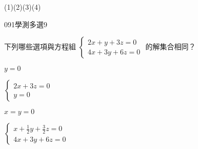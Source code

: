 \begin{QUESTIONS}
\begin{QUESTION}
\begin{QBODY}
        \end{QBODY}
        \begin{QFROMS}
        \end{QFROMS}
        \begin{QTAGS}\end{QTAGS}
        \begin{QANS}
            (1)(2)(3)(4)
        \end{QANS}
        \begin{QSOLLIST}
        \end{QSOLLIST}
        \begin{QEMPTYSPACE}
        \end{QEMPTYSPACE}
    \end{QUESTION}
    \begin{QUESTION}
        \begin{ExamInfo}{091}{學測}{多選}{9}
        \end{ExamInfo}
        \begin{ExamAnsRateInfo}{31}{53}{26}{14}
        \end{ExamAnsRateInfo}
        \begin{QBODY}
            下列哪些選項與方程組 $\left\{ \begin{array}{l} 2x+y+3z=0 \\ 4x+3y+6z =0 \end{array}\right.$ 的解集合相同？
            
            \begin{QOPS} 
                \QOP $y=0$ 
                
                \QOP 
                $\left\{ \begin{array}{l} 2x+3z=0 \\y=0 \end{array}\right.$
                
                \QOP
                $x=y=0$
                
                \QOP
                $\left\{ \begin{array}{l} x+\frac{1}{2}y+\frac{3}{2}z=0 \\ 4x+3y+6z =0 \end{array}\right.$
                

\end{QOPS}
\end{QBODY}
\end{QUESTION}
\end{QUESTIONS}
